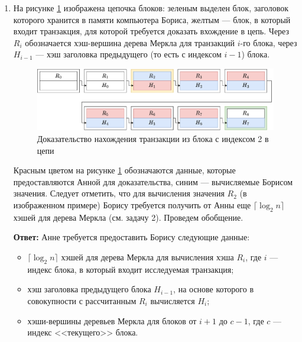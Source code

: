 \documentclass[12pt, a4paper]{extarticle}
\newcommand{\Answer}[1]{\textbf{Ответ:} #1}
\begin{document}
\begin{enumerate}
    \item На рисунке \ref{fig:3.1} изображена цепочка блоков: зеленым выделен блок, заголовок которого
        хранится в памяти компьютера Бориса, желтым --- блок, в который входит транзакция, для которой
        требуется доказать вхождение в цепь. Через $R_i$ обозначается хэш-вершина дерева Меркла для 
        транзакций $i$-го блока, через $H_{i - 1}$ --- хэш заголовка предыдущего (то есть с индексом 
        $i - 1$) блока.
        \begin{figure}[h!]
            \centering
            \includegraphics[width=\textwidth]{3.1.png}
            \caption{Доказательство нахождения транзакции из блока с индексом 2 в цепи}
            \label{fig:3.1}
        \end{figure}
        
        Красным цветом на рисунке \ref{fig:3.1} обозначаются данные, которые предоставляются Анной
        для доказательства, синим --- вычисляемые Борисом значения. Следует отметить, что для вычисления
        значения $R_2$ (в изображенном примере) Борису требуется получить от Анны еще 
        $\lceil \log_2 n \rceil$ хэшей для дерева Меркла (см. задачу 2). Проведем обобщение.
        
        \Answer{Анне требуется предоставить Борису следующие данные:
            \begin{itemize}
                \item $\lceil \log_2 n \rceil$ хэшей для дерева Меркла для вычисления хэша $R_i$,
                    где $i$ --- индекс блока, в который входит исследуемая транзакция;
                \item хэш заголовка предыдущего блока $H_{i - 1}$, на основе которого в совокупности с 
                    рассчитанным $R_i$ вычисляется $H_i$;
                \item хэши-вершины деревьев Меркла для блоков от $i + 1$ до $c - 1$, где $c$ --- индекс
                    <<текущего>> блока.
            \end{itemize}
        }
        

\end{enumerate}
\end{document}
